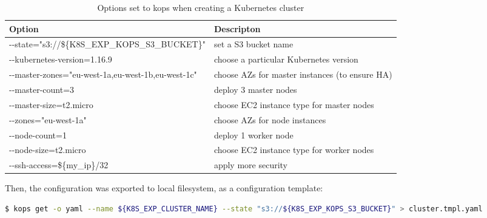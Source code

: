 \begin{table}[H]
\small
\begin{tabularx}{1\textwidth} {
  | >{\centering\arraybackslash}X
  | >{\centering\arraybackslash}X | }
 \hline
  \textbf{Option} & \textbf{Descripton}  \\
 \hline
 -{}-state="s3://\$\{K8S\_EXP\_KOPS\_S3\_BUCKET\}"  & set a S3 bucket name \\
 \hline
 -{}-kubernetes-version=1.16.9  & choose a particular Kubernetes version \\
 \hline
 -{}-master-zones="eu-west-1a,eu-west-1b,eu-west-1c"  & choose AZs for master instances (to ensure HA) \\
 \hline
 -{}-master-count=3  & deploy 3 master nodes \\
 \hline
 -{}-master-size=t2.micro  & choose EC2 instance type for master nodes \\
 \hline
 -{}-zones="eu-west-1a"  & choose AZs for node instances \\
 \hline
 -{}-node-count=1  & deploy 1 worker node \\
 \hline
 -{}-node-size=t2.micro  & choose EC2 instance type for worker nodes \\
 \hline
 -{}-ssh-access=\$\{my\_ip\}/32  & apply more security \\
 \hline
\end{tabularx}
\caption{\label{tab:kops-production-options}Options set to kops when creating a Kubernetes cluster}
\end{table}


Then, the configuration was exported to local filesystem, as a configuration template:
\begin{lstlisting}[basicstyle=\tiny,caption={Command used export kops configuration from S3 to a local file},captionpos=b,language=Bash,xleftmargin=1cm]
$ kops get -o yaml --name ${K8S_EXP_CLUSTER_NAME} --state "s3://${K8S_EXP_KOPS_S3_BUCKET}" > cluster.tmpl.yaml
\end{lstlisting}

